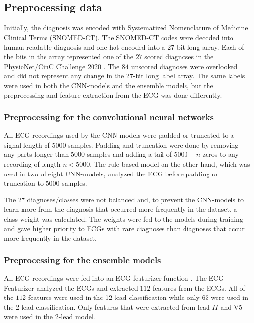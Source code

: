 \subsection{Preprocessing data}
Initially, the diagnosis was encoded with Systematized Nomenclature of Medicine Clinical Terms (SNOMED-CT). The SNOMED-CT codes were decoded into human-readable diagnosis and one-hot encoded into a $27$-bit long array. Each of the bits in the array represented one of the $27$ scored diagnoses in the PhysioNet/CinC Challenge 2020 \cite{alday_classification_2020}. The $84$ unscored diagnoses were overlooked and did not represent any change in the 27-bit long label array. The same labels were used in both the CNN-models and the ensemble models, but the preprocessing and feature extraction from the ECG was done differently.

\subsubsection{Preprocessing for the convolutional neural networks} \hfill \break
All ECG-recordings used by the CNN-models were padded or truncated to a signal length of $5000$ samples. Padding and truncation were done by removing any parts longer than $5000$ samples and adding a tail of $5000 - n$ zeros to any recording of length $n<5000$. The rule-based model on the other hand, which was used in two of eight CNN-models, analyzed the ECG before padding or truncation to $5000$ samples.

The $27$ diagnoses/classes were not balanced and, to prevent the CNN-models to learn more from the diagnosis that occurred more frequently in the dataset, a class weight was calculated. The weights were fed to the models during training and gave higher priority to ECGs with rare diagnoses than diagnoses that occur more frequently in the dataset. 

\subsubsection{Preprocessing for the ensemble models}\hfill \break
All ECG recordings were fed into an ECG-featurizer function \cite{bjorn-jostein_singstad_ecg-featurizer_nodate}. The ECG-Featurizer analyzed the ECGs and extracted $112$ features from the ECGs. All of the $112$ features were used in the 12-lead classification while only $63$ were used in the 2-lead classification. Only features that were extracted from lead $II$ and V5 were used in the 2-lead model.

